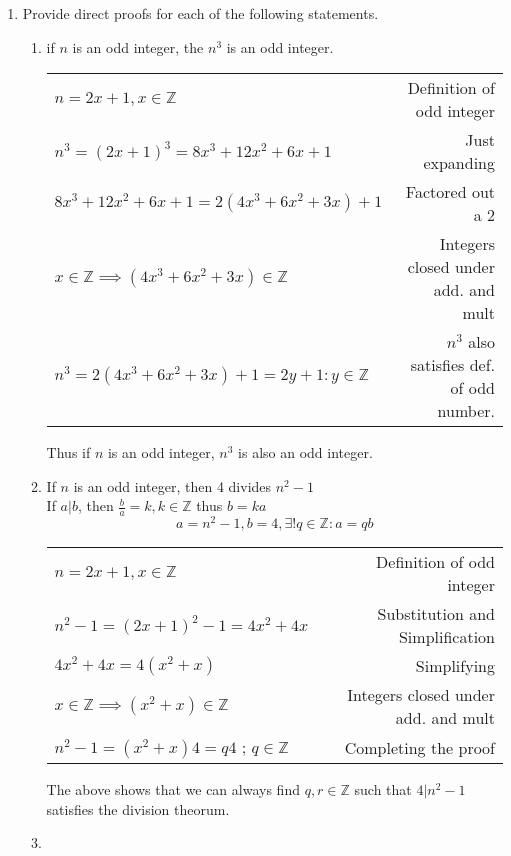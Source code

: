 \documentclass[a4paper,11pt]{article}
\begin{document}
\begin{enumerate}
\item Provide direct proofs for each of the following statements. \\
  \begin{enumerate}

  \item if $n$ is an odd integer, the $n^3$ is an odd integer. \\
  \begin{tabular}{l | r}
  $n = 2x+1, x \in \mathbb{Z}$ & Definition of odd integer \\
  $n^3 = (2x+1)^3 = 8x^3+12x^2+6x+1$ & Just expanding \\
  $8x^3+12x^2+6x+1 = 2(4x^3+6x^2+3x)+1$ & Factored out a 2 \\
  $x \in \mathbb{Z} \implies (4x^3+6x^2+3x) \in \mathbb{Z}$ & Integers closed under add. and mult \\
  $n^3 = 2(4x^3+6x^2+3x)+1 = 2y+1 : y \in \mathbb{Z}$ & $n^3$ also satisfies def. of odd number.
  \end{tabular}
  Thus if $n$ is an odd integer, $n^3$ is also an odd integer.

  \item If $n$ is an odd integer, then 4 divides $n^2-1$ \\
  If $a | b$, then $\frac{b}{a} = k, k \in \mathbb{Z}$ thus $b = ka$
  \[ a = n^2-1, b = 4, \exists! q\in \mathbb{Z} : a = qb\]
  \begin{tabular}{l | r}
  $n = 2x+1, x \in \mathbb{Z}$ & Definition of odd integer \\
  $n^2-1 = (2x+1)^2-1 = 4x^2+4x$ & Substitution and Simplification \\
  $4x^2+4x = 4(x^2+x)$ & Simplifying \\
  $x \in \mathbb{Z} \implies (x^2+x) \in \mathbb{Z}$ & Integers closed under add. and mult \\
  $n^2-1 = (x^2+x)4 = q4$ ;  $ q \in \mathbb{Z}$ & Completing the proof 
  \end{tabular}

  The above shows that we can always find $q,r \in \mathbb{Z}$ such that $4 | n^2-1$ satisfies the division theorum.

  \item



\end{enumerate}
\end{enumerate}
\end{document}
